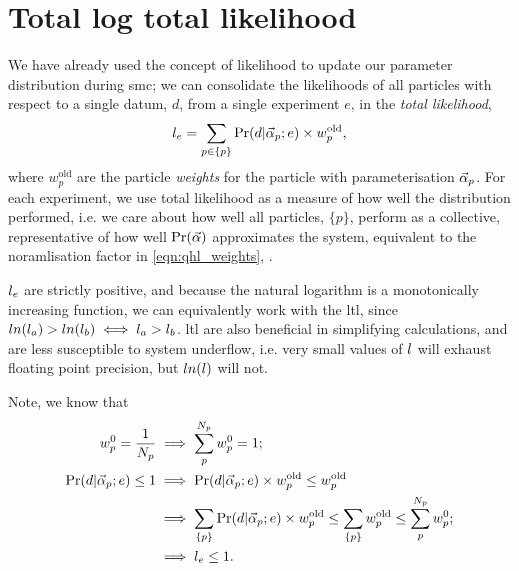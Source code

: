 \section{Total log total likelihood}\label{sec:total_log_total_likelihood}
We have already used the concept of  \gls{likelihood} to update our parameter distribution during \gls{smc}; 
    we can consolidate the \glspl{likelihood}  of all \glspl{particle} with respect to a single datum, $d$, from a single experiment $e$,  
    in the \emph{total likelihood}, 
    \begin{equation}
        \label{eqn:total_likelihood}
        l_{e} = \sum\limits_{p \in \{p\}} \Pr(d | \vec{\alpha}_p ; e) \times w_p^{\textrm{old}},
    \end{equation}
    where $w_p^{\textrm{old}}$ are the \gls{particle} \emph{weights} for the \gls{particle} with parameterisation $\vec{\alpha}_p$.
For each experiment, we use total \gls{likelihood} as a measure of how well the distribution performed,
    i.e. we care about how well all \glspl{particle}, $\{p\}$, perform as a collective, representative of how well $\Pr(\vec{\alpha})$ approximates the system,
    equivalent to the noramlisation factor in \cref{eqn:qhl_weights}, \cite{granade2015characterizationp92}. 

$l_{e}$ are strictly positive, and because the natural logarithm is a monotonically increasing function, 
    we can equivalently work with the \gls{ltl}, 
    since $ln(l_a) > ln(l_b) \iff l_a > l_b$. 
\gls{ltl} are also beneficial in simplifying calculations, 
    and are less susceptible to system underflow, 
    i.e. very small values of $l$ will exhaust floating point precision, 
    but $ln(l)$ will not. 
\par 

Note, we know that
\begin{align}    
    \label{eqn:likelihood_deriv}
    \begin{split}
        w_p^0 = \frac{1}{N_p} & \implies \sum_p^{N_p} w_p^0 = 1 ; \\
        \Pr(d | \vec{\alpha}_p; e) \leq 1 & \implies \Pr(d | \vec{\alpha}_p; e) \times w_p^{\textrm{old}} \leq w_p^{\textrm{old}} \\
        & \implies \sum\limits_{\{p\}} \Pr(d | \vec{\alpha}_p; e) \times w_p^{\textrm{old}} \leq \sum\limits_{\{p\}} w_p^{\textrm{old}} \leq \sum_p^{N_p} w_p^0; \\
        & \implies l_{e} \leq 1.
    \end{split}
\end{align}

